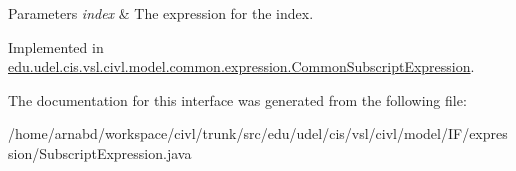 \begin{DoxyParams}{Parameters}
{\em index} & The expression for the index. \\
\hline
\end{DoxyParams}


Implemented in \hyperlink{classedu_1_1udel_1_1cis_1_1vsl_1_1civl_1_1model_1_1common_1_1expression_1_1CommonSubscriptExpression_a32bfcd78e1884fd28518e97ea8998216}{edu.\+udel.\+cis.\+vsl.\+civl.\+model.\+common.\+expression.\+Common\+Subscript\+Expression}.



The documentation for this interface was generated from the following file\+:\begin{DoxyCompactItemize}
\item 
/home/arnabd/workspace/civl/trunk/src/edu/udel/cis/vsl/civl/model/\+I\+F/expression/Subscript\+Expression.\+java\end{DoxyCompactItemize}

